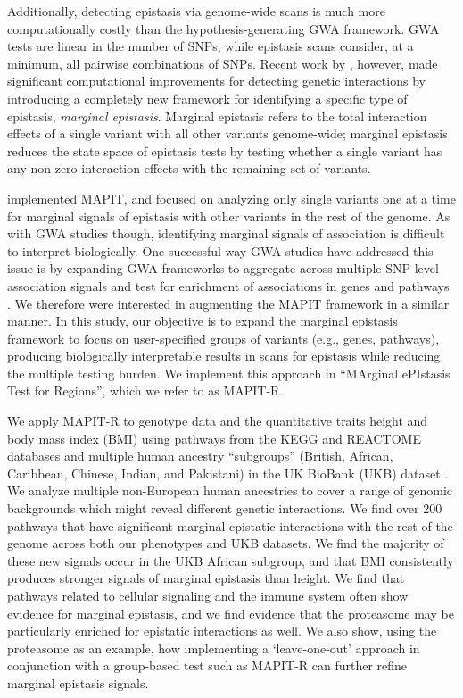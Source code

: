 \documentclass[12pt,a4paper]{article}
\begin{document}
Additionally, detecting epistasis via genome-wide scans is much more computationally costly than the hypothesis-generating GWA framework. GWA tests are linear in the number of SNPs, while epistasis scans consider, at a minimum, all pairwise combinations of SNPs. Recent work by \citet{Crawford2017a}, however, made significant computational improvements for detecting genetic interactions by introducing a completely new framework for identifying a specific type of epistasis, \textit{marginal epistasis}. %
Marginal epistasis refers to the total interaction effects of a single variant with all other variants genome-wide; marginal epistasis reduces the state space of epistasis tests by testing whether a single variant has any non-zero interaction effects with the remaining set of variants. 

\citet{Crawford2017a} implemented MAPIT, and focused on analyzing only single variants one at a time for marginal signals of epistasis with other variants in the rest of the genome. As with GWA studies though, identifying marginal signals of association is difficult to interpret biologically. One successful way GWA studies have addressed this issue is by expanding GWA frameworks to aggregate across multiple SNP-level association signals and test for enrichment of associations in genes and pathways \citep{Subramanian2005,Cantor2010,Wang2010,Lee2012,Carbonetto2013,Mooney2014,Gamazon2015,de2016,Nakka2016,Zhu2018,Cheng2019,Sun2019}. We therefore were interested in augmenting the MAPIT framework in a similar manner. In this study, our objective is to expand the marginal epistasis framework to focus on user-specified groups of variants (e.g., genes, pathways), producing biologically interpretable results in scans for epistasis while reducing the multiple testing burden. We implement this approach in ``MArginal ePIstasis Test for Regions'', which we refer to as MAPIT-R.

We apply MAPIT-R to genotype data and the quantitative traits height and body mass index (BMI) using pathways from the KEGG and REACTOME databases \citep{Liberzon2011} and multiple human ancestry ``subgroups'' (British, African, Caribbean, Chinese, Indian, and Pakistani)  in the UK BioBank (UKB) dataset \citep{Sudlow2015}. We analyze multiple non-European human ancestries to cover a range of genomic backgrounds which might reveal different genetic interactions. We find over 200 pathways that have significant marginal epistatic interactions with the rest of the genome across both our phenotypes and UKB datasets. We find the majority of these new signals occur in the UKB African subgroup, and that BMI consistently produces stronger signals of marginal epistasis than height. We find that pathways related to cellular signaling and the immune system often show evidence for marginal epistasis, and we find evidence that the proteasome may be particularly enriched for epistatic interactions as well. We also show, using the proteasome as an example, how implementing a `leave-one-out' approach in conjunction with a group-based test such as MAPIT-R can further refine marginal epistasis signals.   
\end{document}
